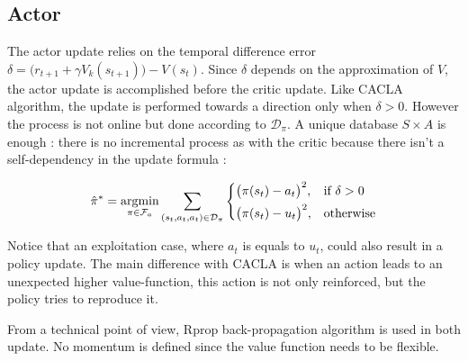 \subsection{Actor}

The actor update
relies on the temporal difference error $\delta = \big( r_{t+1} + \gamma V_k(s_{t+1}) \big) - V(s_t)$.
Since $\delta$ depends on the approximation of $V$, the actor update is accomplished before the critic update.
Like CACLA algorithm, the update is performed towards a direction only when $\delta > 0$.
However the process is not online but done according to $\mathcal{D}_\pi$.
A unique database $ S \times A$ is enough : there is no incremental process as with the critic
because there isn't a self-dependency in the update formula :

\begin{equation}
 \hat{\pi}^* = \underset{\pi \in \mathcal{F}_a}{\text{argmin}} 
 \sum_{ (s_t,a_t, a_t) \in \mathcal{D}_\pi}
 \begin{dcases}
  \big( \pi(s_t) - a_t \big)^2 ,& \text{if } \delta > 0\\
  \big( \pi(s_t) - u_t \big)^2 ,& \text{otherwise}
 \end{dcases}
\end{equation}

Notice that an exploitation case, where $a_t$ is equals to $u_t$, could also
result in a policy update. The main difference with CACLA is when an action leads to an unexpected higher value-function,
this action is not only reinforced, but the policy tries to reproduce it.


From a technical point of view, Rprop back-propagation algorithm \cite{Igel2000, Riedmiller1992} is used in both update.
No momentum is defined since the value function needs to be flexible.
